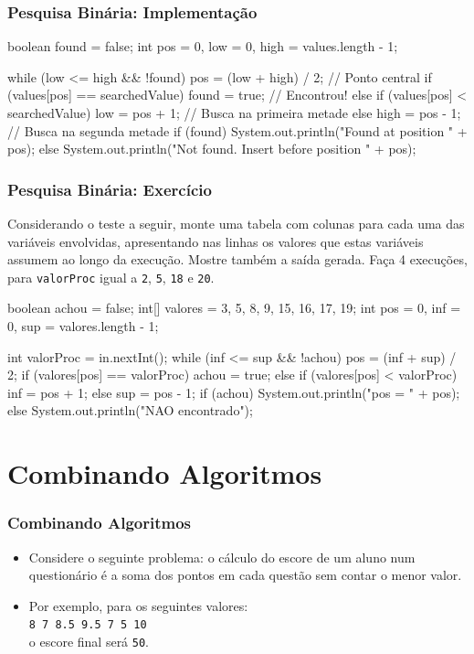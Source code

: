 \documentclass[xcolor={dvipsnames,table},aspectratio=169]{beamer}
\begin{document}
\begin{frame}[fragile]\frametitle{Pesquisa Binária: Implementação}
{\scriptsize
\begin{javacode}
boolean found = false;
int pos = 0, low = 0, high = values.length - 1;

while (low <= high && !found) {
   pos = (low + high) / 2; // Ponto central
   if (values[pos] == searchedValue)
      found = true;        // Encontrou!
   else if (values[pos] < searchedValue) 
      low = pos + 1;       // Busca na primeira metade
   else
      high = pos - 1;      // Busca na segunda metade
}
if (found)
   System.out.println("Found at position " + pos);
else 
   System.out.println("Not found. Insert before position " + pos);
\end{javacode}
}
\end{frame}

\begin{frame}[fragile]\frametitle{Pesquisa Binária: Exercício}
{\scriptsize
Considerando o teste a seguir, monte uma tabela com colunas para cada uma das variáveis envolvidas, apresentando nas linhas os valores que estas variáveis assumem ao longo da execução. Mostre também a saída gerada. Faça 4 execuções, para \texttt{valorProc} igual a \texttt{2}, \texttt{5}, \texttt{18} e \texttt{20}.}\\
{\tiny
\begin{javacode}
boolean achou = false;
int[] valores = { 3, 5, 8, 9, 15, 16, 17, 19};
int pos = 0, inf = 0, sup = valores.length - 1;

int valorProc = in.nextInt();
while (inf <= sup && !achou) {
   pos = (inf + sup) / 2;
   if (valores[pos] == valorProc)
      achou = true;
   else if (valores[pos] < valorProc) 
      inf = pos + 1;
   else
      sup = pos - 1;
}
if (achou)
   System.out.println("pos = " + pos);
else 
   System.out.println("NAO encontrado");
\end{javacode}
}
\end{frame}

\section{Combinando Algoritmos}

\begin{frame}\frametitle{Combinando Algoritmos}
\begin{itemize}
	\item Considere o seguinte problema: o cálculo do escore de um aluno num questionário é a soma dos pontos em cada questão sem contar o menor valor.
	\item Por exemplo, para os seguintes valores:\\ \texttt{8    7    8.5    9.5    7     5    10}\\o escore final será \texttt{50}.
\end{itemize}
\end{frame}
	
\end{document}
